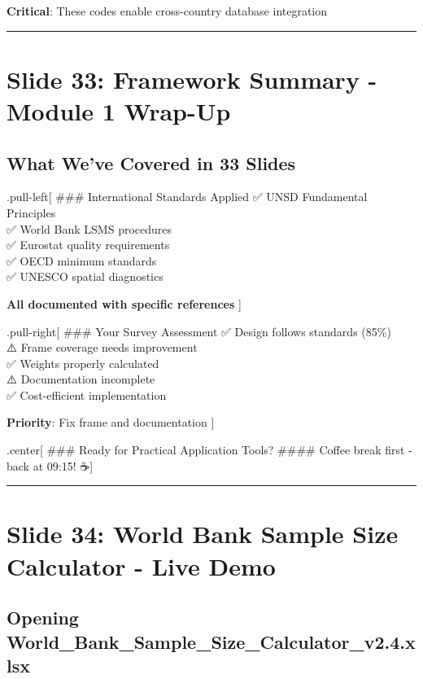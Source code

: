 \documentclass[
]{article}
\begin{document}
\textbf{Critical}: These codes enable cross-country database integration

\begin{center}\rule{0.5\linewidth}{0.5pt}\end{center}

\section{Slide 33: Framework Summary - Module 1
Wrap-Up}\label{slide-33-framework-summary---module-1-wrap-up}

\subsection{What We've Covered in 33
Slides}\label{what-weve-covered-in-33-slides}

.pull-left{[} \#\#\# International Standards Applied ✅ UNSD Fundamental
Principles\\
✅ World Bank LSMS procedures\\
✅ Eurostat quality requirements\\
✅ OECD minimum standards\\
✅ UNESCO spatial diagnostics

\textbf{All documented with specific references} {]}

.pull-right{[} \#\#\# Your Survey Assessment ✅ Design follows standards
(85\%)\\
⚠️ Frame coverage needs improvement\\
✅ Weights properly calculated\\
⚠️ Documentation incomplete\\
✅ Cost-efficient implementation

\textbf{Priority}: Fix frame and documentation {]}

.center{[} \#\#\# Ready for Practical Application Tools? \#\#\#\# Coffee
break first - back at 09:15! ☕{]}

\begin{center}\rule{0.5\linewidth}{0.5pt}\end{center}

\section{Slide 34: World Bank Sample Size Calculator - Live
Demo}\label{slide-34-world-bank-sample-size-calculator---live-demo}

\subsection{Opening
World\_Bank\_Sample\_Size\_Calculator\_v2.4.xlsx}\label{opening-world_bank_sample_size_calculator_v2.4.xlsx}
\end{document}
